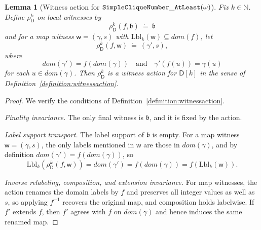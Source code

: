 \documentclass[11pt,a4paper]{article}
\newtheorem{lemma}[theorem]{Lemma}
\newcommand{\treewidthvalue}{k}
\newcommand{\N}{\mathbb{N}}
\newcommand{\defeq}{~\dot{=}~}
\newcommand{\awitness}{\mathsf{w}}
\newcommand{\dpcore}{\mathsf{D}}
\newcommand{\dpNamePart}[1]{\mbox{\normalfont\ttfamily #1}}
\newcommand{\simpleCliqueNumberAtLeastCore}[1]{\dpNamePart{SimpleCliqueNumber}\_\allowbreak\dpNamePart{AtLeast}(#1)}
\newcommand{\domain}{dom}
\newcommand{\cliqueparameter}{\omega}
\newcommand{\cliquemap}{\gamma}
\newcommand{\cliquesize}{s}
\newcommand{\cliquefound}{\mathfrak{b}}
\newcommand{\relabelingfunction}{f}
\newcommand{\action}{\rho}
\begin{document}
{			\begin{lemma}[Witness action for $\simpleCliqueNumberAtLeastCore{\cliqueparameter}$]
		\label{lemma:witness-action-clique}
		Fix $\treewidthvalue\in \N$.
		Define $\action_{\dpcore}^{\treewidthvalue}$ on local witnesses by
		\[
		\action_{\dpcore}^{\treewidthvalue}(\relabelingfunction,\cliquefound)\defeq \cliquefound
		\]
		and for a map witness $\awitness=(\cliquemap,\cliquesize)$ with $\mathrm{Lbl}_{\treewidthvalue}(\awitness)\subseteq \domain(\relabelingfunction)$, let
		\[
		\action_{\dpcore}^{\treewidthvalue}(\relabelingfunction,\awitness)
		\defeq
		(\cliquemap',\cliquesize),
		\]
			where
			\[
			\domain(\cliquemap')=\relabelingfunction(\domain(\cliquemap))
			\quad\text{and}\quad
			\cliquemap'(\relabelingfunction(u))=\cliquemap(u)
			\]
			for each $u\in \domain(\cliquemap)$.
		Then $\action_{\dpcore}^{\treewidthvalue}$ is a witness action for $\dpcore[\treewidthvalue]$ in the sense of Definition~\ref{definition:witnessaction}.
		\end{lemma}
		\begin{proof}
		We verify the conditions of Definition~\ref{definition:witnessaction}.

		\smallskip\noindent
		\emph{Finality invariance.}
		The only final witness is $\cliquefound$, and it is fixed by the action.

		\smallskip\noindent
		\emph{Label support transport.}
		The label support of $\cliquefound$ is empty. For a map witness $\awitness=(\cliquemap,\cliquesize)$, the only labels mentioned in $\awitness$ are those in $\domain(\cliquemap)$, and by definition $\domain(\cliquemap')=\relabelingfunction(\domain(\cliquemap))$, so
		\[
		\mathrm{Lbl}_{\treewidthvalue}(\action_{\dpcore}^{\treewidthvalue}(\relabelingfunction,\awitness))
		=\domain(\cliquemap')
		=\relabelingfunction(\domain(\cliquemap))
		=\relabelingfunction(\mathrm{Lbl}_{\treewidthvalue}(\awitness)).
		\]

		\smallskip\noindent
		\emph{Inverse relabeling, composition, and extension invariance.}
		For map witnesses, the action renames the domain labels by $\relabelingfunction$ and preserves all integer values as well as $\cliquesize$, so applying $\relabelingfunction^{-1}$ recovers the original map, and composition holds labelwise.
		If $\relabelingfunction'$ extends $\relabelingfunction$, then $\relabelingfunction'$ agrees with $\relabelingfunction$ on $\domain(\cliquemap)$ and hence induces the same renamed map.


\end{proof}}
\end{document}
